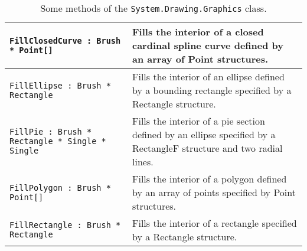 \begin{table}
\begin{center}
\begin{tabularx}{\linewidth}{|l|X|}
      \hline
      \lstinline{FillClosedCurve : Brush * Point[]}	
      &Fills the interior of a closed cardinal spline curve defined by an array of Point structures.\\
      \hline
      \lstinline{FillEllipse : Brush * Rectangle}	
      &Fills the interior of an ellipse defined by a bounding rectangle specified by a Rectangle structure.\\
      \hline
      \lstinline{FillPie : Brush * Rectangle * Single * Single}	
      &Fills the interior of a pie section defined by an ellipse specified by a RectangleF structure and two radial lines.\\
      \hline
      \lstinline{FillPolygon : Brush * Point[]}	
      &Fills the interior of a polygon defined by an array of points specified by Point structures.\\
      \hline
      \lstinline{FillRectangle : Brush * Rectangle}	
      &Fills the interior of a rectangle specified by a Rectangle structure.\\
      \hline
    \end{tabularx}
  \end{center}
  \caption{Some methods of the \lstinline!System.Drawing.Graphics! class.}
  \label{tab:graphicsMethods}
\end{table}

